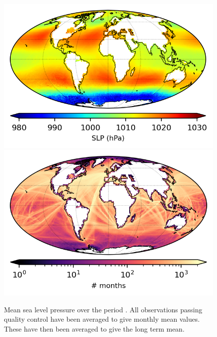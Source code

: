 \begin{figure}[h]
    \includegraphics{resources/observations-slp-mean-map-optimal.png}
    \includegraphics{resources/observations-slp-months-map-optimal.png}    
    \caption{Mean sea level pressure over the period \datatimerange{}. All observations passing quality control have been averaged to give monthly mean values. These have then been averaged to give the long term mean.\\}
    \label{fig:slp-map}
\end{figure}
\FloatBarrier
